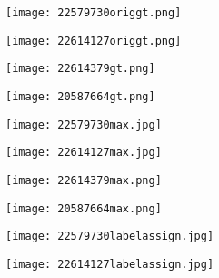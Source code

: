 \documentclass[runningheads,a4paper]{llncs}
\begin{document}
\begin{figure}[!t]
	\setlength{\abovecaptionskip}{0.cm}
	\setlength{\belowcaptionskip}{-0.cm}
	\begin{center}
		\begin{minipage}{0.15\linewidth}
			\centerline{\texttt{[image: 22579730origgt.png]}}
		\end{minipage}
		\hspace{1cm}
		\begin{minipage}{0.15\linewidth}
			\centerline{\texttt{[image: 22614127origgt.png]}}
		\end{minipage}
		\hspace{1cm}
		\begin{minipage}{0.15\linewidth}
			\centerline{\texttt{[image: 22614379gt.png]}}
		\end{minipage}
		\hspace{1cm}
		\begin{minipage}{0.15\linewidth}
			\centerline{\texttt{[image: 20587664gt.png]}}
		\end{minipage}
		\vfill
		\begin{minipage}{0.15\linewidth}
			\centerline{\texttt{[image: 22579730max.jpg]}}
		\end{minipage}
		\hspace{1cm}
		\begin{minipage}{0.15\linewidth}
			\centerline{\texttt{[image: 22614127max.jpg]}}
		\end{minipage}
		\hspace{1cm}
		\begin{minipage}{0.15\linewidth}
			\centerline{\texttt{[image: 22614379max.png]}}
		\end{minipage}
		\hspace{1cm}
		\begin{minipage}{0.15\linewidth}
			\centerline{\texttt{[image: 20587664max.png]}}
		\end{minipage}
		\vfill
		\begin{minipage}{0.15\linewidth}
			\centerline{\texttt{[image: 22579730labelassign.jpg]}}
		\end{minipage}
		\hspace{1cm}
		\begin{minipage}{0.15\linewidth}
			\centerline{\texttt{[image: 22614127labelassign.jpg]}}
		\end{minipage}

\end{center}
\end{figure}
\end{document}
